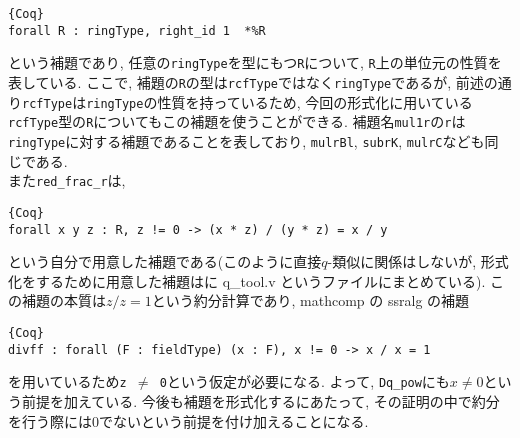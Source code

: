\documentclass[11pt]{jsreport}
\theoremstyle{mystyle}
\newcommand{\0}{\textbf{0}}
\newcommand{\1}{\textbf{1}}
\newcommand{\2}{\textbf{2}}
\begin{document}
\begin{lstlisting}{Coq}
forall R : ringType, right_id 1  *%R
\end{lstlisting}
という補題であり, 任意の{\tt ringType}を型にもつ{\tt R}について, {\tt R}上の単位元の性質を表している. ここで, 補題の{\tt R}の型は{\tt rcfType}ではなく{\tt ringType}であるが, 前述の通り{\tt rcfType}は{\tt ringType}の性質を持っているため, 今回の形式化に用いている{\tt rcfType}型の{\tt R}についてもこの補題を使うことができる. 補題名{\tt mul1r}の{\tt r}は{\tt ringType}に対する補題であることを表しており, {\tt mulrBl}, {\tt subrK}, {\tt mulrC}なども同じである. \\
また{\tt red\_frac\_r}は, 
\begin{lstlisting}{Coq}
forall x y z : R, z != 0 -> (x * z) / (y * z) = x / y \end{lstlisting}
という自分で用意した補題である(このように直接$q$-類似に関係はしないが, 形式化をするために用意した補題は\cite{coq qana}に q\_tool.v というファイルにまとめている). この補題の本質は$z / z = 1$という約分計算であり, mathcomp の ssralg の補題
\begin{lstlisting}{Coq}
divff : forall (F : fieldType) (x : F), x != 0 -> x / x = 1 \end{lstlisting}
を用いているため{\tt z $\neq$ 0}という仮定が必要になる. よって, {\tt Dq\_pow}にも{\tt $x \ne 0$}という前提を加えている. 今後も補題を形式化するにあたって, その証明の中で約分を行う際には$0$でないという前提を付け加えることになる. 
\end{document}
